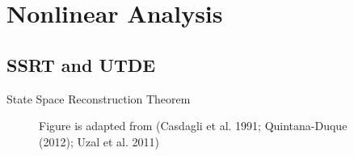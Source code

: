 
\section{Nonlinear Analysis}


\subsection{SSRT and UTDE}
{

\begin{frame}{State Space Reconstruction Theorem}
    \begin{figure}
	{Figure is adapted from (Casdagli et al. 1991; Quintana-Duque (2012); Uzal et al. 2011)} 
   \end{figure}
	
\end{frame}
}


